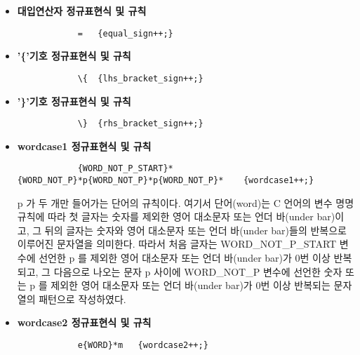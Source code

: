 \documentclass{article}
\begin{document}
\begin{itemize}
\begin{itemize}
\begin{lstlisting}
			"//"(.*)\n {comment++;}
			"/*"([^\*]|(\*+[^\/]))*"*/" {comment++;}
			\end{lstlisting}
			큰 따옴표는 백슬래시를 사용하지 않고 메타 문자를 문자 자체로 인식하기 위해
			사용한다. 첫 번째 정규표현식은 single line comment 의 정규표현식으로,
			슬래시 문자 두개가 먼저 나오고, 개행이 등장하기 직전까지의 모든 문자열의 반복을
			의미한다. 두 번째 정규표현식은 multi line comment 의 정규표현식으로,
			슬래시와 별표(asterisk) 문자가 먼저 나오고, 그 뒤로 별 표시가 아닌 모든 문자
			또는 별표시가 한 개 이상 반복되고 그 뒤에 개행이 아닌 모든 문자가 0 번 이상 반복된 뒤
			별표시와 슬래시 문자로 끝나는 문자열 패턴이다. 이것은 별표시가 multi line comment
			사이에 들어오기 위해서는 별표시 뒤에 슬래시가 있으면 안된다는 의미이다. 
			또한, multi line comment 는 single line comment 와 달리 패턴 끝에 
			개행문자가 포함되지 않는다.
			\item {\bf 대입연산자 정규표현식 및 규칙}
			\begin{lstlisting}
			=	{equal_sign++;}
			\end{lstlisting}
			\item {\bf '\{'기호 정규표현식 및 규칙}
			\begin{lstlisting}
			\{	{lhs_bracket_sign++;}
			\end{lstlisting}
			\item {\bf '\}'기호 정규표현식 및 규칙}
			\begin{lstlisting}
			\}	{rhs_bracket_sign++;}
			\end{lstlisting}
			\item {\bf wordcase1 정규표현식 및 규칙}
			\begin{lstlisting}
			{WORD_NOT_P_START}*{WORD_NOT_P}*p{WORD_NOT_P}*p{WORD_NOT_P}*	{wordcase1++;}
			\end{lstlisting}
			p 가 두 개만 들어가는 단어의 규칙이다. 여기서 단어(word)는 C 언어의 변수 명명 규칙에
			따라 첫 글자는 숫자를 제외한 영어 대소문자 또는 언더 바(under bar)이고, 그 뒤의 글자는
			숫자와 영어 대소문자 또는 언더 바(under bar)들의 반복으로 이루어진 문자열을 의미한다.
			따라서 처음 글자는 WORD\_NOT\_P\_START 변수에 선언한 p 를 제외한 
			영어 대소문자 또는 언더 바(under bar)가 0번 이상 반복되고, 그 다음으로 나오는 문자
			p 사이에 WORD\_NOT\_P 변수에 선언한 숫자 또는 p 를 제외한 영어 대소문자 또는
			언더 바(under bar)가 0번 이상 반복되는 문자열의 패턴으로 작성하였다.
			\item {\bf wordcase2 정규표현식 및 규칙}
			\begin{lstlisting}
			e{WORD}*m	{wordcase2++;}
			\end{lstlisting}

\end{itemize}
\end{itemize}
\end{document}

